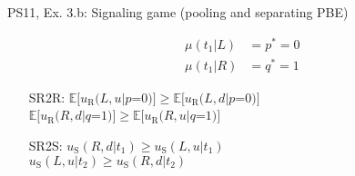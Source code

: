 \begin{frame}{PS11, Ex. 3.b: Signaling game (pooling and separating PBE)}
\begin{multicols}{2}
\begin{itemize}
        \begin{align*}
          \mu(t_1|L)&=p^*=0&\\
          \mu(t_1|R)&=q^*=1
        \end{align*}
        \item[SR2R:] \vspace{-6pt}
                     $\mathbb{E}[u_\text{R}(L,u|p$=$0)]\geq\mathbb{E}[u_\text{R}(L,d|p$=$0)]$\\
                     $\mathbb{E}[u_\text{R}(R,d|q$=$1)]\geq \mathbb{E}[u_\text{R}(R,u|q$=$1)]$
        \item[SR2S:] $u_\text{S}(R,d|t_1)\geq u_\text{S}(L,u|t_1)$\\
                     $u_\text{S}(L,u|t_2)\geq u_\text{S}(R,d|t_2)$
      \end{itemize}
      \vfill\null \columnbreak
      \vfill
    \end{multicols}
\end{frame}
